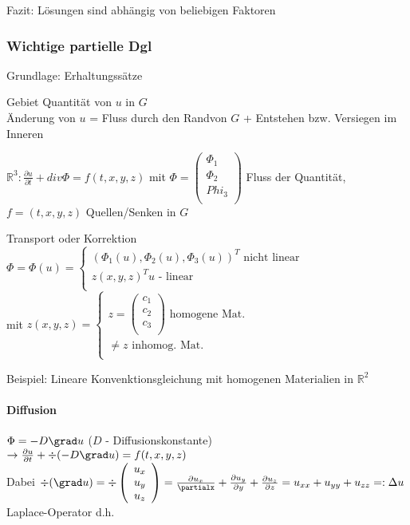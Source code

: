 \documentclass[a4paper]{scrartcl}
\begin{document}
Fazit: Lösungen sind abhängig von beliebigen Faktoren

\subsubsection{Wichtige partielle Dgl} %
Grundlage: Erhaltungssätze

Gebiet Quantität von $u$ in $G$\\
Änderung von $u$ =  Fluss durch den Randvon $G$ + Entstehen bzw. Versiegen im Inneren

$\mathbb{R}^3 : \frac{\partial u}{\partial t} + div \Phi = f(t,x,y,z)$ mit $\Phi = \left( \begin{array}{c} \Phi_1 \\ \Phi_2 \\ Phi_3 \\ \end{array} \right)$ Fluss der Quantität, $f= (t,x,y,z)$ Quellen/Senken in $G$

Transport oder Korrektion
$\Phi = \Phi (u) = \left\{ \begin{array}{c} (\Phi_1 (u) , \Phi_2 (u), \Phi_3 (u))^T \text{ nicht linear} \\ z(x,y,z)^T u \text{ - linear} \\ \end{array} \right.$\\

mit $z(x,y,z) = \left\{ \begin{array}{c} z = \left( \begin{array}{c} c_1 \\ c_2 \\ c_3\\ \end{array} \right) \text{ homogene Mat.} \\ \neq z  \text{ inhomog. Mat.}\\ \end{array} \right.$

Beispiel: Lineare Konvenktionsgleichung mit homogenen Materialien in $\mathbb{R}^2$

\paragraph{Diffusion}
$\Phi = -D \grad u$ ($D$ - Diffusionskonstante)\\
$\rightarrow \frac{\partial u}{\partial t} + \div (-D \grad u) = f(t,x,y,z)$\\
Dabei $\div (\grad u) = \div \left( \begin{array}{c} u_x \\ u_y \\ u_z \\ \end{array} \right) = \frac{\partial u_x}{\partialx} + \frac{\partial u_y}{\partial y} + \frac{\partial u_z}{\partial z} = u_{xx} + u_{yy} + u_{zz} =: \Delta u$ Laplace-Operator d.h.
\end{document}
